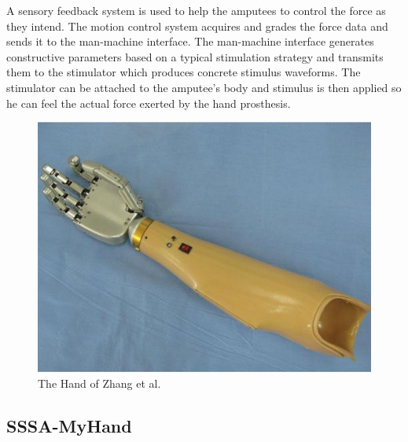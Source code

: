 \documentclass[a4paper, 10pt, conference]{ieeeconf}      %
\begin{document}
A sensory feedback system is used to help the amputees to control the force as they intend. The motion control system acquires and grades the force data and sends it to the man-machine interface. The man-machine interface generates constructive parameters based on a typical stimulation strategy and transmits them to the stimulator which produces concrete stimulus waveforms. The stimulator can be attached to the amputee's body and stimulus is then applied so he can feel the actual force exerted by the hand prosthesis.

\begin{figure}[h]

	\centering
	\includegraphics[scale=0.7]{images/Zhang}
	
	\caption{The Hand of Zhang et al.}
\end{figure}

\subsection{SSSA-MyHand}
\end{document}

